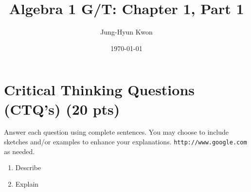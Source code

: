 \documentclass[11pt]{article}
\begin{document}
\title{Algebra 1 G/T: Chapter 1, Part 1}
\author{Jung-Hyun Kwon}
\date{\today}
\maketitle
 
\section{Critical Thinking Questions
(CTQ's) (20 pts)}

Answer each question using complete sentences. You may choose to include sketches and/or examples to enhance your explanations.
\texttt{http://www.google.com} as needed.

\begin{enumerate}
\item Describe
\item Explain

\end{enumerate} 
 
\end{document}
